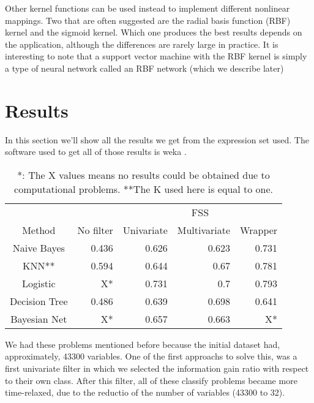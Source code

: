 \documentclass[conference,a4paper]{IEEEtran}
\begin{document}
Other kernel functions can be used instead to implement different nonlinear mappings. Two that are often suggested are the radial basis function (RBF) kernel and the sigmoid kernel. Which one produces the best results depends on the application, although the differences are rarely large in practice. It is interesting to note that a support vector machine with the RBF kernel is simply a type of neural network called an RBF network (which we describe later)

\section{Results}


In this section we'll show all the results we get from the expression set used. The software used to get all of those results is weka \cite{weka}. 

\begin{table}[h]
\caption{*: The X values means no results could be obtained due to computational problems. **The K used here is equal to one.}
\centering
\begin{tabular}{c r r r r}
\hline\hline
 & & \multicolumn{3}{c}{FSS} \\
Method & No filter & Univariate & Multivariate & Wrapper\\ [0.2ex]
\hline
Naive Bayes & 0.436 & 0.626 & 0.623 & 0.731 \\
KNN** & 0.594 & 0.644 & 0.67 & 0.781 \\
Logistic &  X* & 0.731 & 0.7 & 0.793\\
Decision Tree & 0.486 & 0.639 & 0.698 & 0.641\\
Bayesian Net & X* & 0.657 & 0.663 & X* \\ [1ex]
\hline
\end{tabular}
\label{table:basicsResults}
\end{table}

We had these problems mentioned before because the initial dataset had, approximately, 43300 variables. One of the first approachs to solve this, was a first univariate filter in which we selected the information gain ratio with respect to their own class. After this filter, all of these classify problems became more time-relaxed, due to the reductio of the number of variables (43300 to 32).
\end{document}
